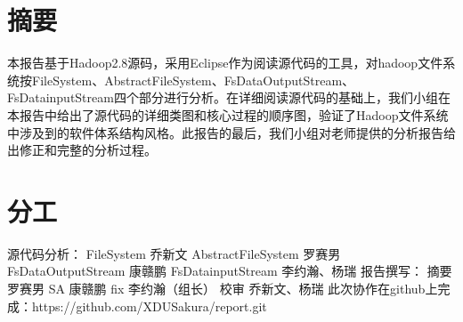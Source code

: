 \section{摘要}
\label{sec:summary}
本报告基于Hadoop2.8源码，采用Eclipse作为阅读源代码的工具，对hadoop文件系统按FileSystem、AbstractFileSystem、FsDataOutputStream、FsDatainputStream四个部分进行分析。在详细阅读源代码的基础上，我们小组在本报告中给出了源代码的详细类图和核心过程的顺序图，验证了Hadoop文件系统中涉及到的软件体系结构风格。此报告的最后，我们小组对老师提供的分析报告给出修正和完整的分析过程。


\section{分工}
\label{sec:undefined}
源代码分析：
FileSystem                  乔新文
AbstractFileSystem          罗赛男
FsDataOutputStream          康赣鹏
FsDatainputStream        李约瀚、杨瑞
\newline
报告撰写：
摘要                        罗赛男
SA                          康赣鹏
fix                         李约瀚（组长）
校审                        乔新文、杨瑞
\newline
此次协作在github上完成：https://github.com/XDUSakura/report.git        

\endinput
